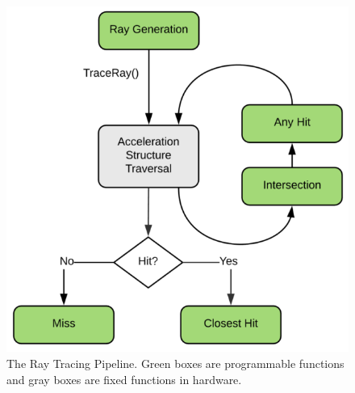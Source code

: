 \documentclass[12pt]{article}
\begin{document}
\begin{figure}[H]
    \begin{center}
        \includegraphics[scale=0.25]{RayTracing-Pipeline}
    \end{center}
    \caption{
        The Ray Tracing Pipeline.
        Green boxes are programmable functions and gray boxes are fixed functions in hardware.
        \parencite{NVIDIA:DXR-Intro}
    }
    \label{fig:RayTracing-Pipeline}
\end{figure}
\end{document}
